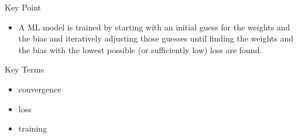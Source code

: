 \documentclass{beamer}
\begin{document}

\begin{frame}{Key Point}
\begin{itemize}
    \item A ML model is trained by starting with an initial guess for the weights and the bias and iteratively adjusting those guesses until finding the weights and the bias with the lowest possible (or sufficiently low) loss are found.
\end{itemize}
\end{frame}

\begin{frame}{Key Terms}
\begin{itemize}
    \item convergence
    \item loss
    \item training
\end{itemize}
\end{frame}
\end{document}

